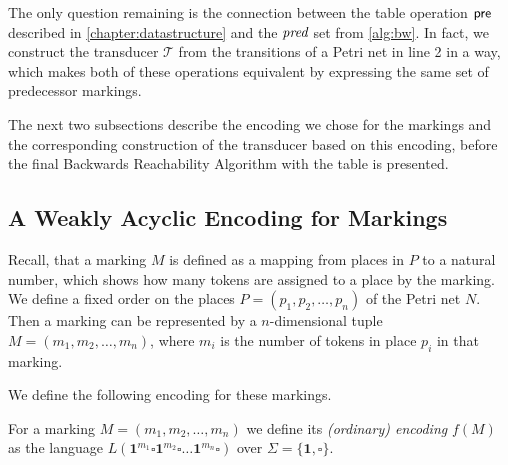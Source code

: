 The only question remaining is the connection between the table operation $\operatorname{\textsf{pre}}$ described in \autoref{chapter:datastructure} and the $\operatorname{\textit{pred}}$ set from \autoref{alg:bw}. In fact, we construct the transducer $\mathcal{T}$ from the transitions of a Petri net in line 2 in a way, which makes both of these operations equivalent by expressing the same set of predecessor markings.

\par 

The next two subsections describe the encoding we chose for the markings and the corresponding construction of the transducer based on this encoding, before the final Backwards Reachability Algorithm with the table is presented.

\subsection{A Weakly Acyclic Encoding for Markings}
Recall, that a marking $M$ is defined as a mapping from places in $P$ to a natural number, which shows how many tokens are assigned to a place by the marking. 
We define a fixed order on the places $P = (p_{1},p_{2},\dots,p_{n})$ of the Petri net $N$. Then a marking can be represented by a $n$-dimensional tuple $M = (m_{1},m_{2},\dots,m_{n})$, where $m_{i}$ is the number of tokens in place $p_{i}$ in that marking.

\par 

We define the following encoding for these markings.

\begin{definition}\label{def:encoding}
For a marking $M = (m_{1},m_{2},\dots,m_{n})$ we define its \emph{(ordinary) encoding} $f(M)$ as the language $L(\bm{1}^{m_{1}} \square \bm{1}^{m_{2}} \square \ldots \bm{1}^{m_{n}} \square)$ over $\Sigma = \{\bm{1}, \square\}$.
\end{definition}


